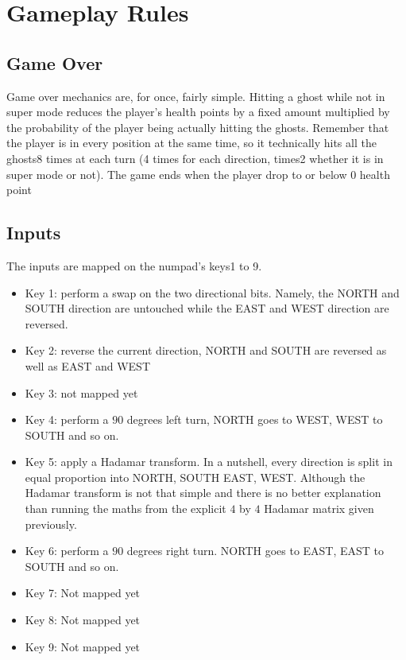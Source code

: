 \documentclass[a4paper]{article}
\begin{document}
\section{Gameplay Rules}

\subsection{Game Over}

Game over mechanics are, for once, fairly simple. Hitting a ghost while not in super mode reduces the player’s health points by a fixed amount multiplied by the probability of the player being actually hitting the ghosts.
Remember that the player is in every position at the same time, so it technically hits all the ghosts8 times at each turn (4 times for each direction, times2 whether it is in super mode or not).
The game ends when the player drop to or below $0$ health point

\subsection{Inputs}

The inputs are mapped on the numpad’s keys1 to 9. 
\begin{itemize}
\item Key 1: perform a swap on the two directional bits. Namely, the NORTH and SOUTH direction are untouched while the EAST and WEST direction are reversed.
\item Key 2: reverse the current direction, NORTH and SOUTH are reversed as well as EAST and WEST
\item Key 3: not mapped yet
\item Key 4: perform a $90$ degrees left turn, NORTH goes to WEST, WEST to SOUTH and so on.
\item Key 5: apply a Hadamar transform. In a nutshell, every direction is split in equal proportion into NORTH, SOUTH EAST, WEST. Although the Hadamar transform is not that simple and there is no better explanation than running the maths from the explicit $4$ by $4$ Hadamar matrix given previously. 
\item Key 6: perform a $90$ degrees right turn. NORTH goes to EAST, EAST to SOUTH and so on.
\item Key 7: Not mapped yet
\item Key 8: Not mapped yet
\item Key 9: Not mapped yet
\end{itemize}
\end{document}

